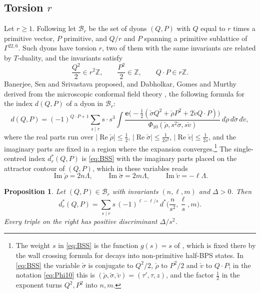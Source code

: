 \documentclass[11pt]{amsart}
\newtheorem{proposition}[theorem]{Proposition}
\theoremstyle{definition}
\newcommand{\ZZ}{\mathbb{Z}}
\newcommand{\e}{\mathbf e}
\newcommand{\cB}{\mathcal B}
\begin{document}
\subsection{\texorpdfstring{Torsion $r$}{Torsion r}}
Let $r\ge1$. Following \cite{BSS08a} let $\cB_r$ be the set of dyons $(Q,P)$ with $Q$ equal to $r$ times a primitive vector, $P$ primitive, and $Q/r$ and $P$ spanning a primitive sublattice of $\Gamma^{22,6}$. Such dyons have torsion $r$, two of them with the same invariants are related by $T$-duality, and the invariants satisfy
\begin{equation}\label{eq:quant}
\frac{Q^2}2\in r^2\ZZ,\qquad \frac{P^2}2\in\ZZ,\qquad Q\cdot P\in r\ZZ.
\end{equation}
Banerjee, Sen and Srivastava \cite[eqs.~(3)--(7)]{BSS08a} proposed, and Dabholkar, Gomes and Murthy derived from the microscopic conformal field theory \cite[eqs.~(3.24)--(3.28)]{DGM11}, the following formula for the index $d(Q,P)$ of a dyon in $\cB_r$:
\begin{equation}\label{eq:BSS}
d(Q,P)=(-1)^{Q\cdot P+1}\sum_{s\mid r}s\cdot s^3\int\frac{\e\big(-\tfrac12(\check\sigma Q^2+\check\rho P^2+2\check vQ\cdot P)\big)}{\Phi_{10}(\check\rho,s^2\check\sigma,s\check v)}\,d\check\rho\,d\check\sigma\,d\check v,
\end{equation}
where the real parts run over $|\operatorname{Re}\check\rho|\le\frac12$, $|\operatorname{Re}\check\sigma|\le\frac1{2s^2}$, $|\operatorname{Re}\check v|\le\frac1{2s}$, and the imaginary parts are fixed in a region where the expansion converges.\footnote{The weight $s$ in \eqref{eq:BSS} is the function $g(s)=s$ of \cite{BSS08a}, which is fixed there by the wall crossing formula for decays into non-primitive half-BPS states. In \eqref{eq:BSS} the variable $\check\sigma$ is conjugate to $Q^2/2$, $\check\rho$ to $P^2/2$ and $\check v$ to $Q\cdot P$; in the notation \eqref{eq:Phi10} this is $(\check\rho,\check\sigma,\check v)=(\tau',\tau,z)$, and the factor $\frac12$ in the exponent turns $Q^2,P^2$ into $n,m$.} The single-centred index $d^*_r(Q,P)$ is \eqref{eq:BSS} with the imaginary parts placed on the attractor contour of $(Q,P)$, which in these variables reads
\begin{equation}\label{eq:attr}
\operatorname{Im}\check\rho=2n\Lambda,\qquad\operatorname{Im}\check\sigma=2m\Lambda,\qquad\operatorname{Im}\check v=-\ell\Lambda.
\end{equation}

\begin{proposition}\label{prop:torsion}
Let $(Q,P)\in\cB_r$ with invariants $(n,\ell,m)$ and $\Delta>0$. Then
\begin{equation}\label{eq:torsion}
d^*_r(Q,P)=\sum_{s\mid r}s\,(-1)^{\ell-\ell/s}\,d^*\Big(\frac n{s^2},\frac\ell s,m\Big).
\end{equation}
Every triple on the right has positive discriminant $\Delta/s^2$.
\end{proposition}
\end{document}
